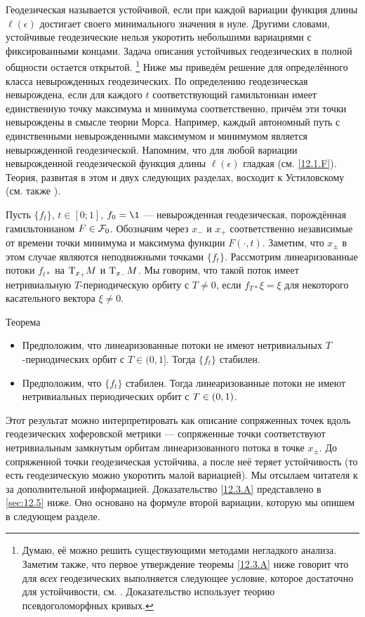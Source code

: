Геодезическая называется устойчивой, если при каждой вариации функция длины $\ell(\epsilon)$ достигает своего минимального значения в нуле.
Другими словами, устойчивые геодезические нельзя укоротить небольшими вариациями с фиксированными концами.
Задача описания устойчивых геодезических в полной общности остается открытой.%
\footnote{Думаю, её можно решить существующими методами негладкого анализа.
Заметим также, что первое утверждение теоремы \ref{12.3.A} ниже говорит что для \emph{всех} геодезических выполняется следующее условие, которое достаточно для устойчивости, см. \cite{LM3}.
Доказательство использует теорию псевдоголоморфных кривых.}
Ниже мы приведём решение для определённого класса невырожденных геодезических.
По определению геодезическая невырождена, если для каждого $t$ соответствующий гамильтониан имеет единственную точку максимума и минимума соответственно, причём эти точки невырождены в смысле теории Морса.
Например, каждый автономный путь с единственными невырожденными максимумом и минимумом является невырожденной геодезической.
Напомним, что для любой вариации невырожденной геодезической функция длины $\ell(\epsilon)$ гладкая (см. \ref{12.1.F}).
Теория, развитая в этом и двух следующих разделах, восходит к Устиловскому \cite{U} (см. также \cite{LM2}).

Пусть $\{f_t\}$, $t \in [0; 1]$, $f_0 = \1$ --- невырожденная геодезическая, порождённая гамильтонианом $F\in \mathcal{F}_0$.
Обозначим через $x_-$ и $x_+$ соответственно независимые от времени точки минимума и максимума функции $F(\cdot, t)$.
Заметим, что $x_\pm$ в этом случае являются неподвижными точками $\{f_t\}$.
Рассмотрим линеаризованные потоки $f_{t*}$ на $\mathrm{T}_{x_+}M$ и $\mathrm{T}_{x_-}M$.
Мы говорим, что такой поток имеет нетривиальную $T$-периодическую орбиту с $T\ne0$, если $f_{T*}\xi=\xi$ для некоторого касательного вектора $\xi\ne0$.

\begin{thm}{Теорема}\label{12.3.A}

\begin{itemize}
\item Предположим, что линеаризованные потоки не имеют нетривиальных $T$-периодических орбит с $T\in(0,1]$.
Тогда $\{f_t\}$ стабилен.
\item Предположим, что $\{f_t\}$ стабилен.
Тогда линеаризованные потоки не имеют нетривиальных периодических орбит с $T\z\in(0,1)$.
\end{itemize}
\end{thm}

Этот результат можно интерпретировать как описание сопряженных точек вдоль геодезических хоферовской метрики ---  сопряженные точки соответствуют нетривиальным замкнутым орбитам линеаризованного потока в точке $x_\pm$.
До сопряженной точки геодезическая устойчива, а после неё теряет устойчивость (то есть геодезическую можно укоротить малой вариацией).
Мы отсылаем читателя к \cite{U} за дополнительной информацией.
Доказательство \ref{12.3.A} представлено в \ref{sec:12.5} ниже.
Оно основано на формуле второй вариации, которую мы опишем в следующем разделе.

